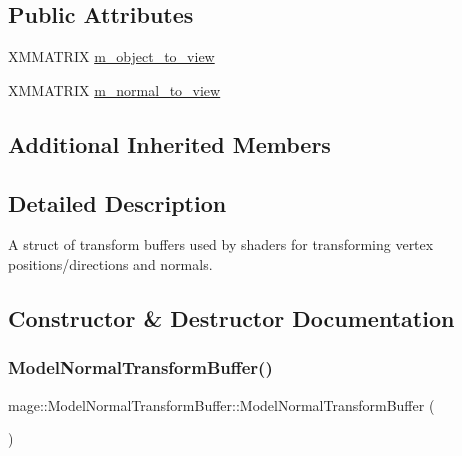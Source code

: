 \subsection*{Public Attributes}
\begin{DoxyCompactItemize}
\item 
X\+M\+M\+A\+T\+R\+IX \hyperlink{structmage_1_1_model_normal_transform_buffer_afd0823b56d399f56245a5e652b25e6d5}{m\+\_\+object\+\_\+to\+\_\+view}
\item 
X\+M\+M\+A\+T\+R\+IX \hyperlink{structmage_1_1_model_normal_transform_buffer_a1d79f8570b8bc020406e007f30bcfb13}{m\+\_\+normal\+\_\+to\+\_\+view}
\end{DoxyCompactItemize}
\subsection*{Additional Inherited Members}


\subsection{Detailed Description}
A struct of transform buffers used by shaders for transforming vertex positions/directions and normals. 

\subsection{Constructor \& Destructor Documentation}
\hypertarget{structmage_1_1_model_normal_transform_buffer_a0ab367c167f3056d32ad06299d9953d0}{}\label{structmage_1_1_model_normal_transform_buffer_a0ab367c167f3056d32ad06299d9953d0} 
\subsubsection{\texorpdfstring{Model\+Normal\+Transform\+Buffer()}{ModelNormalTransformBuffer()}\hspace{0.1cm}{\footnotesize\ttfamily [1/3]}}
{\footnotesize\ttfamily mage\+::\+Model\+Normal\+Transform\+Buffer\+::\+Model\+Normal\+Transform\+Buffer (\begin{DoxyParamCaption}{ }\end{DoxyParamCaption})}

